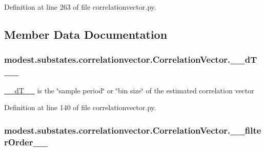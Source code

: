 Definition at line 263 of file correlationvector.\+py.



\subsection{Member Data Documentation}
\subsubsection[{\texorpdfstring{\+\_\+\+\_\+d\+T\+\_\+\+\_\+}{__dT__}}]{\setlength{\rightskip}{0pt plus 5cm}modest.\+substates.\+correlationvector.\+Correlation\+Vector.\+\_\+\+\_\+d\+T\+\_\+\+\_\+\hspace{0.3cm}{\ttfamily [private]}}\hypertarget{classmodest_1_1substates_1_1correlationvector_1_1CorrelationVector_a402e91c0356dd1a8b778916eec7bdd86}{}\label{classmodest_1_1substates_1_1correlationvector_1_1CorrelationVector_a402e91c0356dd1a8b778916eec7bdd86}


\hyperlink{classmodest_1_1substates_1_1correlationvector_1_1CorrelationVector_a402e91c0356dd1a8b778916eec7bdd86}{\+\_\+\+\_\+d\+T\+\_\+\+\_\+} is the \char`\"{}sample period\char`\"{} or \char`\"{}bin size\char`\"{} of the estimated correlation vector 



Definition at line 140 of file correlationvector.\+py.

\subsubsection[{\texorpdfstring{\+\_\+\+\_\+filter\+Order\+\_\+\+\_\+}{__filterOrder__}}]{\setlength{\rightskip}{0pt plus 5cm}modest.\+substates.\+correlationvector.\+Correlation\+Vector.\+\_\+\+\_\+filter\+Order\+\_\+\+\_\+\hspace{0.3cm}{\ttfamily [private]}}\hypertarget{classmodest_1_1substates_1_1correlationvector_1_1CorrelationVector_a6454cf8c143629a28cf684f6abbf4830}{}\label{classmodest_1_1substates_1_1correlationvector_1_1CorrelationVector_a6454cf8c143629a28cf684f6abbf4830}


